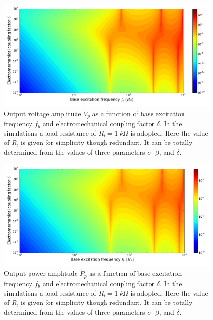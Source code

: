 \documentclass{svjour3}                     %
\begin{document}
\begin{figure}[!htbp]
    \centering
    \includegraphics[width=\textwidth]{./img_eig_asy/fig_sol_analytic_out_vol_contour}
    \caption{Output voltage amplitude $\tilde{V}_p$ as a function of base excitation frequency $f_b$ and electromechanical coupling factor $\delta$. In the simulations a load resistance of $R_l = 1\ k\Omega$ is adopted.  Here the value of $R_l$ is given for simplicity though redundant. It can be totally determined from the values of three parameters $\sigma$, $\beta$, and $\delta$. }
    \label{fig:fig_sol_analytic_out_vol_contour}
\end{figure}

\begin{figure}[!htbp]
    \centering
    \includegraphics[width=\textwidth]{./img_eig_asy/fig_sol_analytic_out_pow_contour}
    \caption{ Output power amplitude $\tilde{P}_p$ as a function of base excitation frequency $f_b$ and electromechanical coupling factor $\delta$. In the simulations a load resistance of $R_l = 1\ k\Omega$ is adopted. Here the value of $R_l$ is given for simplicity though redundant. It can be totally determined from the values of three parameters $\sigma$, $\beta$, and $\delta$. }
    \label{fig:fig_sol_analytic_out_pow_contour}
\end{figure}
\end{document}
